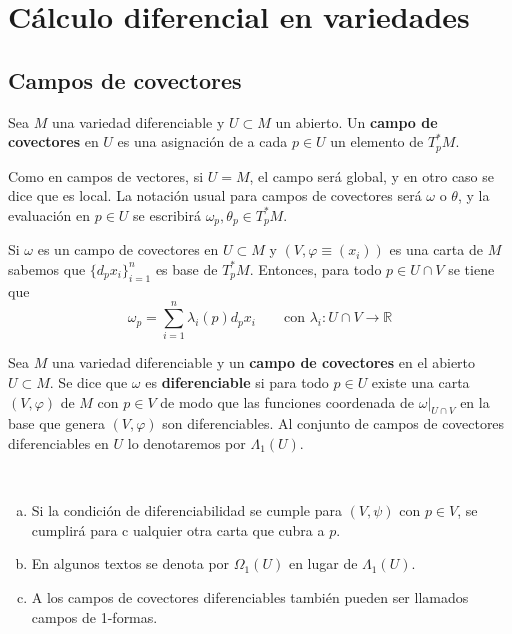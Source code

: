 
\justifying  \setcounter{page}{52} \setcounter{chapter}{4}
\chapter{Cálculo diferencial en variedades}
\section{Campos de covectores}
\begin{defi}
Sea $M$ una variedad diferenciable y $U \subset M$ un abierto. Un \textbf{campo de covectores} en $U$ es una asignación de a cada $p \in U$ un elemento de $T_p^*M$.
\end{defi}

\begin{obs}
Como en campos de vectores, si $U = M$, el campo será global, y en otro caso se dice que es local. La notación usual para campos de covectores será $\omega$ o $\theta$, y la evaluación en $p\in U$ se escribirá $\omega_p,\theta_p \in T_p^*M$.
\end{obs}

Si $\omega$ es un campo de covectores en $U \subset M$ y $(V,\varphi\equiv(x_i))$ es una carta de $M$ sabemos que $\{d_px_i\}_{i=1}^n$ es base de $T_p^*M$. Entonces, para todo $p \in U \cap V$ se tiene que $$\omega_p =  \sum_{i=1}^n \lambda_i(p) d_px_i \qquad \text{con } \lambda_i: U\cap V \to \mathbb{R}$$

\begin{defi}
Sea $M$ una variedad diferenciable y un \textbf{campo de covectores} en el abierto $U \subset M$. Se dice que $\omega$ es \textbf{diferenciable} si para todo $p \in U$ existe una carta $(V,\varphi)$ de $M$ con $p \in V$ de modo que las funciones coordenada de $\omega|_{U\cap V}$ en la base que genera $(V,\varphi)$ son diferenciables. Al conjunto de campos de covectores diferenciables en $U$ lo denotaremos por $\Lambda_1(U)$.
\end{defi}

\begin{obs} \, \vspace{-3mm} \begin{enumerate}[a)] \item Si la condici\'on de diferenciabilidad se cumple para $(V,\psi)$ con $p\in V$, se cumplir\'a para c
ualquier otra carta que cubra a $p$. 
\item En algunos textos se denota por $\Omega_1(U)$ en lugar de $\Lambda_1(U)$. \item A los campos de covectores diferenciables tambi\'en pueden ser llamados campos de 1-formas.
\end{enumerate}
\end{obs}

